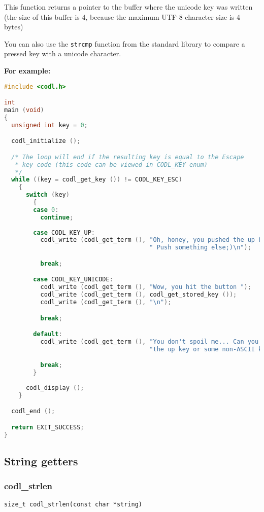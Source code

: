 \documentclass{article}
\newcommand{\fstep}{\vspace{3mm}\noindent}
\begin{document}
\fstep{} This function returns a pointer to the buffer where the
unicode key was written (the size of this buffer is 4, because the maximum
UTF-8 character size is 4 bytes)

You can also use the {\tt strcmp} function from the standard library to compare a
pressed key with a unicode character.

{\vspace{5mm}\noindent\bf\large For example:}

\begin{lstlisting}[language=C]
#include <codl.h>

int
main (void)
{
  unsigned int key = 0;

  codl_initialize ();

  /* The loop will end if the resulting key is equal to the Escape 
   * key code (this code can be viewed in CODL_KEY enum) 
   */
  while ((key = codl_get_key ()) != CODL_KEY_ESC)
    {
      switch (key)
        {
        case 0:
          continue;
        
        case CODL_KEY_UP:
          codl_write (codl_get_term (), "Oh, honey, you pushed the up button..." 
                                        " Push something else;)\n");

          break;

        case CODL_KEY_UNICODE:
          codl_write (codl_get_term (), "Wow, you hit the button ");
          codl_write (codl_get_term (), codl_get_stored_key ());
          codl_write (codl_get_term (), "\n");

          break;

        default:
          codl_write (codl_get_term (), "You don't spoil me... Can you press "
                                        "the up key or some non-ASCII key?\n");

          break;
        }
      
      codl_display ();
    }

  codl_end ();

  return EXIT_SUCCESS;
}
\end{lstlisting}

\subsection{String getters}
\subsubsection{codl\_strlen}
{\tt size\_t codl\_strlen(const char *string)}
\end{document}
